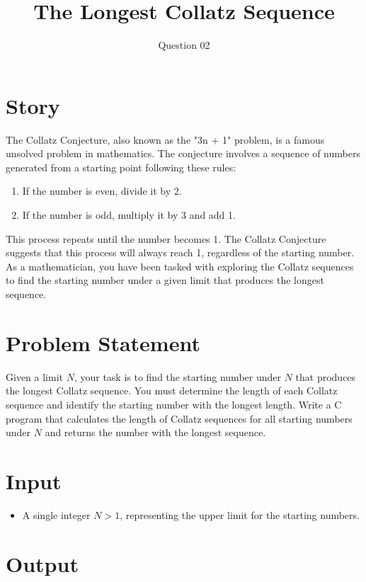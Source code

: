 \documentclass{article}
\title{The Longest Collatz Sequence}
\author{Question 02}
\date{}
\begin{document}
\thispagestyle{empty} %

\maketitle

\section*{Story}
The Collatz Conjecture, also known as the "3n + 1" problem, is a famous unsolved problem in mathematics. The conjecture involves a sequence of numbers generated from a starting point following these rules:

\begin{enumerate}
    \item If the number is even, divide it by 2.
    \item If the number is odd, multiply it by 3 and add 1.
  \end{enumerate}


This process repeats until the number becomes 1. The Collatz Conjecture suggests that this process will always reach 1, regardless of the starting number. As a mathematician, you have been tasked with exploring the Collatz sequences to find the starting number under a given limit that produces the longest sequence.

\section*{Problem Statement}
Given a limit \(N\), your task is to find the starting number under \(N\) that produces the longest Collatz sequence. You must determine the length of each Collatz sequence and identify the starting number with the longest length. Write a C program that calculates the length of Collatz sequences for all starting numbers under \(N\) and returns the number with the longest sequence.

\section*{Input}
\begin{itemize}
    \item A single integer \(N > 1\), representing the upper limit for the starting numbers.
  \end{itemize}

\section*{Output}
\end{document}
